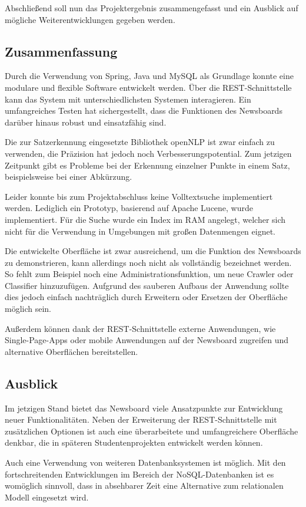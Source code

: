 Abschließend soll nun das Projektergebnis zusammengefasst und ein Ausblick auf mögliche
Weiterentwicklungen gegeben werden.

\subsection{Zusammenfassung}
Durch die Verwendung von Spring, Java und MySQL als Grundlage konnte eine modulare
und flexible Software entwickelt werden. Über die REST-Schnittstelle kann das System
mit unterschiedlichsten Systemen interagieren. Ein umfangreiches Testen hat sichergestellt,
dass die Funktionen des Newsboards darüber hinaus robust und einsatzfähig sind.

Die zur Satzerkennung eingesetzte Bibliothek openNLP ist zwar einfach zu
verwenden, die Präzision hat jedoch noch Verbesserungspotential. Zum jetzigen Zeitpunkt gibt 
es Probleme bei der Erkennung einzelner Punkte in einem Satz, beispielsweise bei einer
Abkürzung.

Leider konnte bis zum Projektabschluss keine Volltextsuche implementiert werden. Lediglich
ein Prototyp, basierend auf Apache Lucene, wurde implementiert. Für die Suche wurde ein 
Index im RAM angelegt, welcher sich nicht für die Verwendung in Umgebungen mit großen
Datenmengen eignet.

Die entwickelte Oberfläche ist zwar ausreichend, um die Funktion des Newsboards
zu demonstrieren, kann allerdings noch nicht als vollständig bezeichnet werden.
So fehlt zum Beispiel noch eine Administrationsfunktion, um neue Crawler oder Classifier
hinzuzufügen. Aufgrund des sauberen Aufbaus der Anwendung sollte dies jedoch einfach
nachträglich durch Erweitern oder Ersetzen der Oberfläche möglich sein.

Außerdem können dank der REST-Schnittstelle externe Anwendungen, wie Single-Page-Apps
oder mobile Anwendungen auf der Newsboard zugreifen und alternative Oberflächen
bereitstellen.

\subsection{Ausblick} 
Im jetzigen Stand bietet das Newsboard viele Ansatzpunkte zur Entwicklung neuer 
Funktionalitäten. Neben der Erweiterung der REST-Schnittstelle mit zusätzlichen Optionen ist 
auch eine überarbeitete und umfangreichere Oberfläche denkbar, die in späteren 
Studentenprojekten entwickelt werden können.

Auch eine Verwendung von weiteren Datenbanksystemen ist möglich. Mit den fortschreitenden
Entwicklungen im Bereich der NoSQL-Datenbanken ist es womöglich sinnvoll, dass in
absehbarer Zeit eine Alternative zum relationalen Modell eingesetzt wird.

